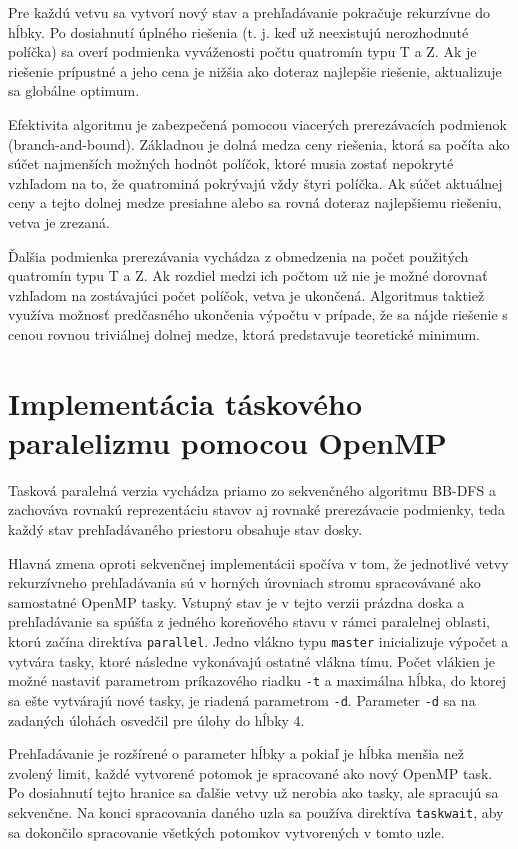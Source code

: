 \documentclass[a4paper]{article}
\begin{document}
Pre každú vetvu sa vytvorí nový stav a prehľadávanie pokračuje rekurzívne do hĺbky. Po dosiahnutí úplného riešenia (t. j. keď už neexistujú nerozhodnuté políčka) sa overí podmienka vyváženosti počtu quatromín typu T a Z. Ak je riešenie prípustné a jeho cena je nižšia ako doteraz najlepšie riešenie, aktualizuje sa globálne optimum.

Efektivita algoritmu je zabezpečená pomocou viacerých prerezávacích podmienok (branch-and-bound). Základnou je dolná medza ceny riešenia, ktorá sa počíta ako súčet najmenších možných hodnôt políčok, ktoré musia zostať nepokryté vzhľadom na to, že quatrominá pokrývajú vždy štyri políčka. 
Ak súčet aktuálnej ceny a tejto dolnej medze presiahne alebo sa rovná doteraz najlepšiemu riešeniu, vetva je zrezaná.

Ďalšia podmienka prerezávania vychádza z obmedzenia na počet použitých quatromín typu T a Z. Ak rozdiel medzi ich počtom už nie je možné dorovnať vzhľadom na zostávajúci počet políčok, vetva je ukončená.
Algoritmus taktiež využíva možnosť predčasného ukončenia výpočtu v prípade, že sa nájde riešenie s cenou rovnou triviálnej dolnej medze, ktorá predstavuje teoretické minimum.


\section{Implementácia táskového paralelizmu pomocou OpenMP}

Tasková paralelná verzia vychádza priamo zo sekvenčného algoritmu BB-DFS a zachováva rovnakú reprezentáciu stavov aj rovnaké prerezávacie podmienky, teda každý stav prehľadávaného priestoru obsahuje stav dosky.

Hlavná zmena oproti sekvenčnej implementácii spočíva v tom, že jednotlivé vetvy rekurzívneho prehľadávania sú v horných úrovniach stromu spracovávané ako samostatné OpenMP tasky. Vstupný stav je v tejto verzii prázdna doska a prehľadávanie sa spúšťa z jedného koreňového stavu v rámci paralelnej oblasti, ktorú začína direktíva \texttt{parallel}. 
Jedno vlákno typu \texttt{master} inicializuje výpočet a vytvára tasky, ktoré následne vykonávajú ostatné vlákna tímu. Počet vlákien je možné nastaviť parametrom príkazového riadku \texttt{-t} a maximálna hĺbka, do ktorej sa ešte vytvárajú nové tasky, je riadená parametrom \texttt{-d}. Parameter \texttt{-d} sa na zadaných úlohách osvedčil pre úlohy do hĺbky $4$.

Prehľadávanie je rozšírené o parameter hĺbky a pokiaľ je hĺbka menšia než zvolený limit, každé vytvorené potomok je spracované ako nový OpenMP task.
Po dosiahnutí tejto hranice sa ďalšie vetvy už nerobia ako tasky, ale spracujú sa sekvenčne. Na konci spracovania daného uzla sa používa direktíva \texttt{taskwait}, aby sa dokončilo spracovanie všetkých potomkov vytvorených v tomto uzle.
\end{document}
